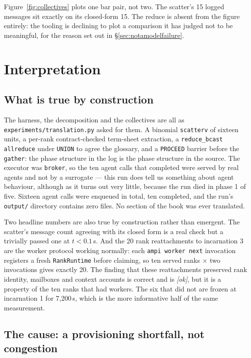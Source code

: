 \documentclass[11pt]{article}
\begin{document}
Figure~\ref{fig:collectives} plots one bar pair, not two. The scatter's 15 logged
messages sit exactly on its closed-form 15. The reduce is absent from the figure
entirely: the tooling is declining to plot a comparison it has judged not to be
meaningful, for the reason set out in \S\ref{sec:notamodelfailure}.

\section{Interpretation}

\subsection{What is true by construction}

The harness, the decomposition and the collectives are all as
\texttt{experiments/translation.py} asked for them. A binomial \texttt{scatterv} of
sixteen units, a per-rank contract-checked term-sheet extraction, a
\texttt{reduce\_bcast} \texttt{allreduce} under \texttt{UNION} to agree the glossary, and
a \texttt{PROCEED} barrier before the \texttt{gather}: the phase structure in the log is
the phase structure in the source. The executor was \texttt{broker}, so the ten agent
calls that completed were served by real agents and not by a surrogate --- this run does
tell us something about agent behaviour, although as it turns out very little, because
the run died in phase 1 of five. Sixteen agent calls were enqueued in total, ten
completed, and the run's \texttt{output/} directory contains zero files. No section of
the book was ever translated.

Two headline numbers are also true by construction rather than emergent. The scatter's
message count agreeing with its closed form is a real check but a trivially passed one
at $t<0.1$\,s. And the 20 rank reattachments to incarnation 3 are the worker protocol
working normally: each \texttt{ampi worker next} invocation registers a fresh
\texttt{RankRuntime} before claiming, so ten served ranks $\times$ two invocations gives
exactly 20. The finding that these reattachments preserved rank identity, mailboxes and
context accounts is correct and is \emph{[ok]}, but it is a property of the ten ranks
that had workers. The six that did not are frozen at incarnation 1 for 7{,}200\,s, which
is the more informative half of the same measurement.

\subsection{The cause: a provisioning shortfall, not congestion}
\end{document}

